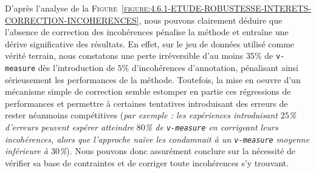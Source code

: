 			D'après l'analyse de la \textsc{Figure~\ref{figure:4.6.1-ETUDE-ROBUSTESSE-INTERETS-CORRECTION-INCOHERENCES}}, nous pouvons clairement déduire que l'absence de correction des incohérences pénalise la méthode et entraîne une dérive significative des résultats.
			En effet, sur le jeu de données utilisé comme vérité terrain, nous constatons une perte irréversible d'au moins $35$\% de \texttt{v-measure} dès l'introduction de $5$\% d'incohérences d'annotation, pénalisant ainsi sérieusement les performances de la méthode.
			Toutefois, la mise en oeuvre d'un mécanisme simple de correction semble estomper en partie ces régressions de performances et permettre à certaines tentatives introduisant des erreurs de rester néanmoins compétitives
			(\textit{par exemple : les expériences introduisant $25$\% d'erreurs peuvent espérer atteindre $80$\% de \texttt{v-measure} en corrigeant leurs incohérences, alors que l'approche naïve les condamnait à un \texttt{v-measure} moyenne inférieure à $30$\%}).
			Nous pouvons donc assurément conclure sur la nécessité de vérifier sa base de contraintes et de corriger toute incohérences s'y trouvant.
			

